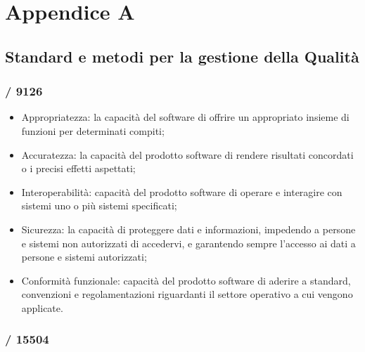 \section{Appendice A}
  \subsection{Standard e metodi per la gestione della Qualità}
    \subsubsection{/ 9126}
    \begin{itemize}
        \item Appropriatezza: la capacità del software di offrire un appropriato insieme di funzioni per determinati compiti;
        \item Accuratezza: la capacità del prodotto software di rendere risultati concordati o i precisi effetti aspettati;
        \item Interoperabilità: capacità del prodotto software di operare e interagire con sistemi uno o più sistemi specificati;
        \item Sicurezza: la capacità di proteggere dati e informazioni, impedendo a persone e sistemi non autorizzati di accedervi, e garantendo sempre l'accesso ai dati a persone e sistemi autorizzati;
        \item Conformità funzionale: capacità del prodotto software di aderire a standard, convenzioni e regolamentazioni riguardanti il settore operativo a cui vengono applicate.
    \end{itemize}
    \subsubsection{/ 15504}
    \subsubsection{}
